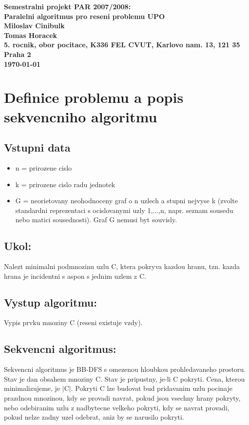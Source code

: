 \documentclass[a4paper]{article}
\begin{document}
\begin{center}
\bf Semestralni projekt PAR 2007/2008:\\[5mm]
    Paralelni algoritmus pro reseni problemu UPO\\[5mm] 
       Miloslav Cinibulk\\
       Tomas Horacek\\[2mm]
5. rocnik, obor pocitace, K336 FEL CVUT, Karlovo nam. 13, 121 35 Praha 2\\[2mm]
\today
\end{center}

\section{Definice problemu a popis sekvencniho algoritmu}

\subsection{Vstupni data}
\begin{itemize}
	\item n = prirozene cislo
	\item k = prirozene cislo radu jednotek
	\item G = neorietovany neohodnoceny graf o n uzlech a stupni nejvyse k (zvolte standardni
	      reprezentaci s ocislovanymi uzly 1,...,n, napr. seznam sousedu nebo matici sousednosti).
	      Graf G nemusi byt souvisly.
\end{itemize}
\subsection{Ukol:}
Nalezt minimalni podmnozinu uzlu C, ktera pokryva kazdou hranu, tzn. kazda hrana je incidentni
s aspon s jednim uzlem z C.
\subsection{Vystup algoritmu:}
Vypis prvku mnoziny C (reseni existuje vzdy).
\subsection{Sekvencni algoritmus:}
Sekvencni algoritmus je BB-DFS s omezenou hloubkou prohledavaneho prostoru. Stav je dan obsahem
mnoziny C. Stav je pripustny, je-li C pokryti. Cena, kterou minimalizujeme, je $|$C$|$.
Pokryti C lze budovat bud pridavanim uzlu pocinaje prazdnou mnozinou, kdy se provadi navrat,
pokud jsou vsechny hrany pokryty, nebo odebiranim uzlu z nadbytecne velkeho pokryti, kdy se navrat
provadi, pokud nelze zadny uzel odebrat, aniz by se narusilo pokryti.
\end{document}
